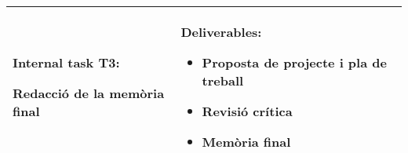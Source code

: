 \begin{center}
\begin{tabular}{| p{8.5cm} | p{5.25cm} |}
            \textbf{Internal task T3:}
                \newline \hspace*{0.3cm}
                \begin{minipage}[t]{8cm}
                    Redacció de la memòria final
                \end{minipage}
                \smallskip
            & 
            \textbf{Deliverables: }
                \begin{itemize}
                    \item { Proposta de projecte i pla de treball }
                    \item { Revisió crítica }
                    \item { Memòria final }
                \end{itemize} \\
        \hline
    \end{tabular}
\end{center}